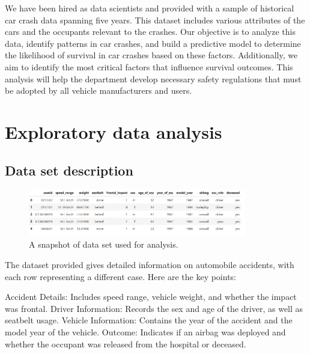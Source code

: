 \documentclass[12pt,a4paper]{article}
\begin{document}
We have been hired as data scientists and provided with a sample of historical car crash data spanning five years. This dataset includes various attributes of the cars and the occupants relevant to the crashes. Our objective is to analyze this data, identify patterns in car crashes, and build a predictive model to determine the likelihood of survival in car crashes based on these factors. Additionally, we aim to identify the most critical factors that influence survival outcomes. This analysis will help the department develop necessary safety regulations that must be adopted by all vehicle manufacturers and users.
	
	\section{Exploratory data analysis}
	\subsection{Data set description}
	\begin{figure}[h]
		\centering
		\includegraphics[width=0.85\textwidth]{dataset.png}
		\caption{A snapshot of data set used for analysis.}
		\label{fig:dataset}
	\end{figure}
The dataset provided gives detailed information on automobile accidents, with each row representing a different case. Here are the key points:

Accident Details: Includes speed range, vehicle weight, and whether the impact was frontal.
Driver Information: Records the sex and age of the driver, as well as seatbelt usage.
Vehicle Information: Contains the year of the accident and the model year of the vehicle.
Outcome: Indicates if an airbag was deployed and whether the occupant was released from the hospital or deceased.
\end{document}
